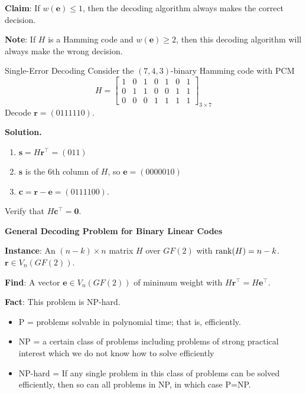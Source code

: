 \textbf{Claim}: If $ w(\bm{e})\leqslant 1 $, then the decoding algorithm always
makes the correct decision.

\textbf{Note}: If $ H $ is a Hamming code and $ w(\bm{e})\geqslant 2 $,
then this decoding algorithm will always make the wrong decision.

\begin{Example}{Single-Error Decoding}{}
    Consider the $ (7,4,3) $-binary Hamming code with PCM
    \[ H=\begin{bmatrix}
            1 & 0 & 1 & 0 & 1 & 0 & 1 \\
            0 & 1 & 1 & 0 & 0 & 1 & 1 \\
            0 & 0 & 0 & 1 & 1 & 1 & 1
        \end{bmatrix}_{3\times 7} \]
    Decode $ \bm{r}=(0111110) $.

    \textbf{Solution.}
    \begin{enumerate}
        \item $ \bm{s}=H\bm{r}^\top=(011) $
        \item $ \bm{s} $ is the 6th column of $ H $, so $ \bm{e}=(0000010) $
        \item $ \bm{c}=\bm{r}-\bm{e}=(0111100) $.
    \end{enumerate}
    Verify that $ H\bm{c}^\top=\bm{0} $.
\end{Example}

\textbf{General Decoding Problem for Binary Linear Codes}

\textbf{Instance}: An $ (n-k)\times n $ matrix $ H $ over $ GF(2) $
with $ \operatorname{rank}(H)=n-k $. $ \bm{r}\in V_n(GF(2)) $.

\textbf{Find}: A vector $ \bm{e}\in V_n(GF(2)) $ of minimum weight
with $ H\bm{r}^\top=H\bm{e}^\top $.

\textbf{Fact}: This problem is NP-hard.

\begin{itemize}
    \item P = problems solvable in polynomial time; that is, efficiently.
    \item NP = a certain class of problems including problems of strong
          practical interest which we do not know how to solve efficiently
    \item NP-hard = If any single problem in this class of problems can be
          solved efficiently, then so can all problems in NP, in which case P=NP\@.
\end{itemize}
